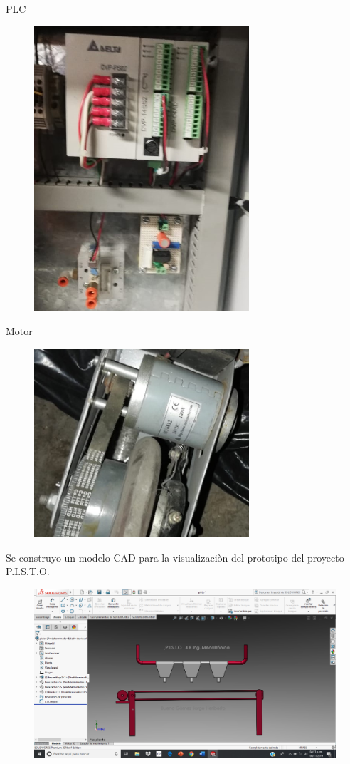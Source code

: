 \documentclass[12pt,a4paper]{article}
\begin{document}
PLC
\begin{figure}[h!]
\centering
\includegraphics[width=8cm]{PLC.jpg} 
\end{figure}

Motor
\begin{figure}[h!]
\centering
\includegraphics[width=8cm]{Motor.jpg} 
\end{figure}
\newpage

Se construyo un modelo CAD para la visualizaciòn del prototipo del proyecto P.I.S.T.O.

\begin{figure}[h!]
\centering
\includegraphics[width=15cm]{img.png} 
\end{figure} 
\newpage
\end{document}
